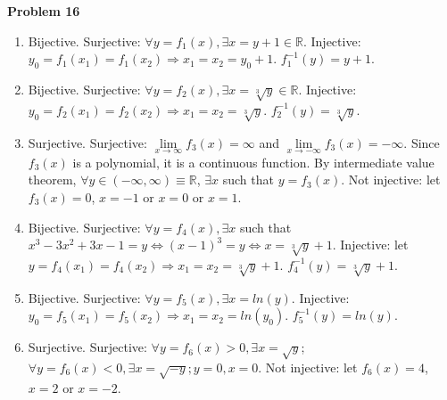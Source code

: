 \documentclass{article}
\begin{document}
\textbf{Problem 16}
\begin{enumerate}[label={(\roman*)}]
    \item Bijective. Surjective: $\forall y=f_1(x), \exists x = y +1\in \mathbb{R}$. Injective: $y_0=f_1(x_1)=f_1(x_2)\Rightarrow x_1=x_2=y_0+1$. $f_1^{-1}(y)=y+1$.
    \item Bijective. Surjective: $\forall y=f_2(x), \exists x = \sqrt[3]{y}\in \mathbb{R}$. Injective: $y_0=f_2(x_1)=f_2(x_2)\Rightarrow x_1=x_2=\sqrt[3]{y}$. $f_2^{-1}(y)=\sqrt[3]{y}$.
    \item Surjective. Surjective: $\lim\limits_{x\rightarrow \infty}f_3(x)=\infty$ and $\lim\limits_{x\rightarrow -\infty}f_3(x)=-\infty$. Since $f_3(x)$ is a polynomial, it is a continuous function. By intermediate value theorem, $\forall y  \in (-\infty,\infty)\equiv \mathbb{R}$, $\exists x$ such that $y=f_3(x)$. Not injective: let $f_3(x)=0$, $x=-1$ or $x=0$ or $x=1$. 
    \item Bijective. Surjective: $\forall y=f_4(x), \exists x$ such that $x^3-3x^2+3x-1=y \Leftrightarrow (x-1)^3=y \Leftrightarrow x=\sqrt[3]{y}+1$. Injective: let $y=f_4(x_1)=f_4(x_2)\Rightarrow x_1=x_2=\sqrt[3]{y}+1$. $f_4^{-1}(y)=\sqrt[3]{y}+1$. 
    \item Bijective. Surjective: $\forall y = f_5(x), \exists x = ln(y)$. Injective: $y_0=f_5(x_1)=f_5(x_2)\Rightarrow x_1=x_2=ln(y_0)$. $f_5^{-1}(y)=ln(y)$. 
    \item Surjective. Surjective: $\forall y = f_6(x) > 0, \exists x=\sqrt{y}$; $\forall y=f_6(x)<0,\exists x=\sqrt{-y};y=0,x=0$. Not injective: let $f_6(x)=4$, $x=2$ or $x=-2$.
\end{enumerate}
\end{document}
